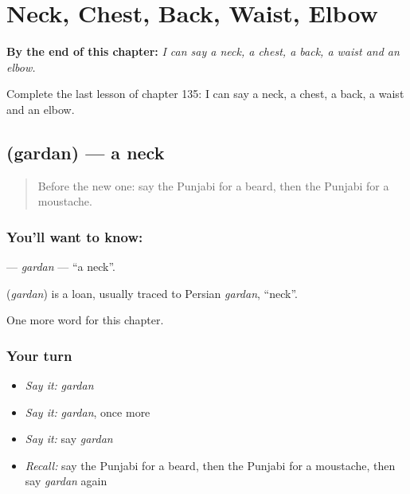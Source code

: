 
\chapter{Neck, Chest, Back, Waist, Elbow}
\label{ch:pa-neck-chest-back-waist-elbow}

\begin{chapteropening}
\textbf{By the end of this chapter:} \emph{I can say a neck, a chest, a back, a waist and an elbow.}

Complete the last lesson of chapter 135: I can say a neck, a chest, a back, a waist and an elbow.
\end{chapteropening}

\section[\texorpdfstring{\pa{ਗਰਦਨ} (gardan)}{ਗਰਦਨ (gardan)}]{ (gardan) — a neck}

\label{lesson:PA-C135-gardan}



\begin{quote}
Before the new one: say the Punjabi for a beard, then the Punjabi for a moustache.
\end{quote}

\subsection*{You'll want to know: }
\textbf{} — \emph{gardan} — \textquotedblleft{}a neck\textquotedblright{}.

\begin{cousinweb}
\textbf{} (\emph{gardan}) is a loan, usually traced to Persian \emph{gardan}, \textquotedblleft{}neck\textquotedblright{}.
\end{cousinweb}

\begin{grammarlens}[title={What you've built}]
One more word for this chapter.
\end{grammarlens}

\subsection*{Your turn}
\begin{itemize}
\raggedright
  \item \emph{Say it:} \emph{gardan}
  \item \emph{Say it:} \emph{gardan}, once more
  \item \emph{Say it:} say \emph{gardan}
  \item \emph{Recall:} say the Punjabi for a beard, then the Punjabi for a moustache, then say \emph{gardan} again
\end{itemize}


